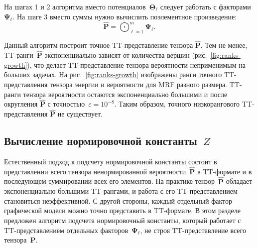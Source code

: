 На шагах 1 и 2 алгоритма вместо потенциалов~$\mathbf{\Theta}_\ell$ следует работать с факторами~$\mathbf{\Psi}_{\ell}$. На шаге 3 вместо суммы нужно вычислить поэлементное произведение:
\begin{equation}
\widehat{\mathbf{P}} =   \bigodot_{\ell = 1}^{m} \mathbf{\Psi}_{\ell}.
\end{equation}

Данный алгоритм построит точное TT\hyp{}представление тензора $\widehat{\mathbf{P}}$. Тем не менее, TT\hyp{}ранги~$\widehat{\mathbf{P}}$ экспоненциально зависят от количества вершин (рис.~\ref{fig:ranks-growth}), что делает TT\hyp{}представление тензора вероятности неприменимым на больших задачах. На рис.~\ref{fig:ranks-growth} изображены ранги точного TT-представления тензора энергии и вероятности для MRF разного размера. TT\hyp{}ранги тензора вероятности остаются экспоненциально большими и после округления $\widehat{\mathbf{P}}$ с точностью~$\varepsilon = 10^{-8}$. Таким образом, точного низкорангового TT\hyp{}представления $\widehat{\mathbf{P}}$ не существует.



\subsection{Вычисление нормировочной константы~$Z$}
\label{sec:partition-function}
Естественный подход к подсчету нормировочной константы состоит в представлении всего тензора ненормированной вероятности~$\widehat{\mathbf{P}}$ в TT\hyp{}формате и в последующем суммировании всех его элементов. На практике тензор~$\widehat{\mathbf{P}}$ обладает экспоненциально большими TT\hyp{}рангами, и работа с его TT\hyp{}представлением становиться неэффективной. С другой стороны, каждый отдельный фактор графической модели можно точно представить в TT\hyp{}формате. В этом разделе предложен алгоритм подсчета нормировочный константы, который работает с TT\hyp{}представлением отдельных факторов~$\mathbf{\Psi}_{\ell}$, не строя TT\hyp{}представление всего тензора~$\widehat{\mathbf{P}}$.

